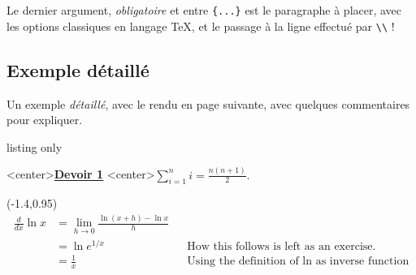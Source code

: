\documentclass[a4paper]{article}
\begin{document}
\smallskip

Le dernier argument, \textit{obligatoire} et entre \texttt{\{...\}} est le paragraphe à placer, avec les options classiques en langage \TeX{}, et le passage à la ligne effectué par \texttt{\textbackslash\textbackslash} !

\subsection{Exemple \og détaillé \fg}

Un exemple \textit{détaillé}, avec le rendu en page suivante, avec quelques commentaires pour expliquer.

\begin{PresentationCode}{listing only}
\pagestyle{empty}

\begin{PleinePageSeyes}[NumLignes]%
	\LignePapierSeyes[Echelle=1.5,Ligne=2,Couleur=red]<center>{\underline{\cursive\bfseries Devoir 1}}
	\ParagraphePapierSeyes[Ligne=10]{\cursive\lipsum[1]}
	\LignePapierSeyes[Ligne=25]<center>{${\displaystyle\sum_{i=1}^{n} i=\displaystyle\frac{n(n+1)}{2}}$.}
	
	\LignePapierSeyes[Echelle=1.1,Ligne=27](-1.4,0.95)
	{
		\begin{align*}
			\frac{d}{dx} \ln x &= \lim_{h\to 0} \frac{\ln(x+h) - \ln x}{h} \\
			&= \ln e^{1/x} &&\text{How this follows is left as an exercise.}\\
			&= \frac{1}{x} &&\text{Using the definition of ln as inverse function}
		\end{align*}
	}
\end{PleinePageSeyes}
\end{PresentationCode}
\end{document}
